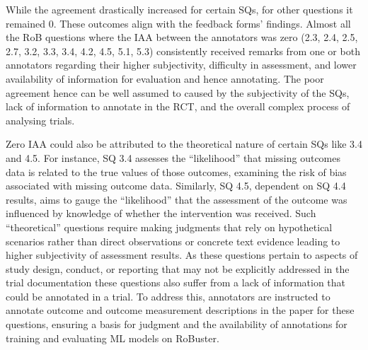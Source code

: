 \documentclass[sn-mathphys,Numbered]{sn-jnl}%
\theoremstyle{thmstyleone}%
\theoremstyle{thmstyletwo}%
\theoremstyle{thmstylethree}%
\begin{document}
While the agreement drastically increased for certain SQs, for other questions it remained 0.
These outcomes align with the feedback forms' findings.
Almost all the RoB questions where the IAA between the annotators was zero (2.3, 2.4, 2.5, 2.7, 3.2, 3.3, 3.4, 4.2, 4.5, 5.1, 5.3) consistently received remarks from one or both annotators regarding their higher subjectivity, difficulty in assessment, and lower availability of information for evaluation and hence annotating.
The poor agreement hence can be well assumed to caused by the subjectivity of the SQs, lack of information to annotate in the RCT, and the overall complex process of analysing trials.


Zero IAA could also be attributed to the theoretical nature of certain SQs like 3.4 and 4.5.
For instance, SQ 3.4 assesses the ``likelihood'' that missing outcomes data is related to the true values of those outcomes, examining the risk of bias associated with missing outcome data.
Similarly, SQ 4.5, dependent on SQ 4.4 results, aims to gauge the ``likelihood'' that the assessment of the outcome was influenced by knowledge of whether the intervention was received. 
Such ``theoretical'' questions require making judgments that rely on hypothetical scenarios rather than direct observations or concrete text evidence leading to higher subjectivity of assessment results.
As these questions pertain to aspects of study design, conduct, or reporting that may not be explicitly addressed in the trial documentation these questions also suffer from a lack of information that could be annotated in a trial.
To address this, annotators are instructed to annotate outcome and outcome measurement descriptions in the paper for these questions, ensuring a basis for judgment and the availability of annotations for training and evaluating ML models on RoBuster.
\end{document}
